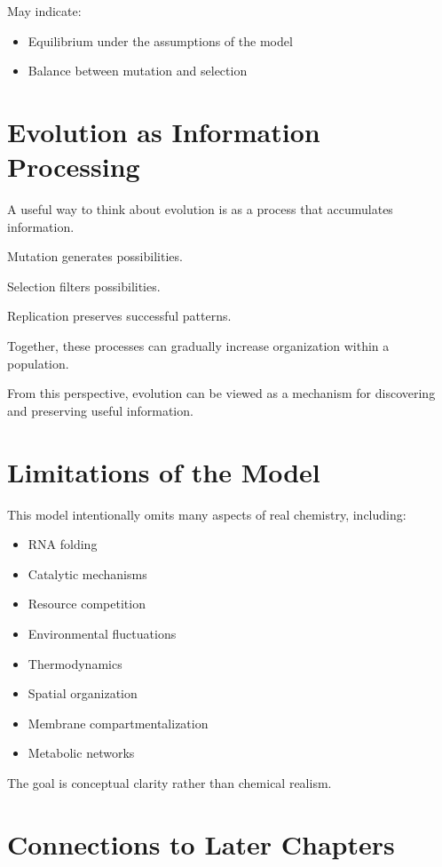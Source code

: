 \documentclass[
  oneside,
  openany]{book}
\providecommand{\tightlist}{%
  \setlength{\itemsep}{0pt}\setlength{\parskip}{0pt}}
\begin{document}
May indicate:

\begin{itemize}
\tightlist
\item
  Equilibrium under the assumptions of the model
\item
  Balance between mutation and selection
\end{itemize}

\section{Evolution as Information Processing}\label{evolution-as-information-processing}

A useful way to think about evolution is as a process that accumulates information.

Mutation generates possibilities.

Selection filters possibilities.

Replication preserves successful patterns.

Together, these processes can gradually increase organization within a population.

From this perspective, evolution can be viewed as a mechanism for discovering and preserving useful information.

\section{Limitations of the Model}\label{limitations-of-the-model-1}

This model intentionally omits many aspects of real chemistry, including:

\begin{itemize}
\tightlist
\item
  RNA folding
\item
  Catalytic mechanisms
\item
  Resource competition
\item
  Environmental fluctuations
\item
  Thermodynamics
\item
  Spatial organization
\item
  Membrane compartmentalization
\item
  Metabolic networks
\end{itemize}

The goal is conceptual clarity rather than chemical realism.

\section{Connections to Later Chapters}\label{connections-to-later-chapters}
\end{document}
